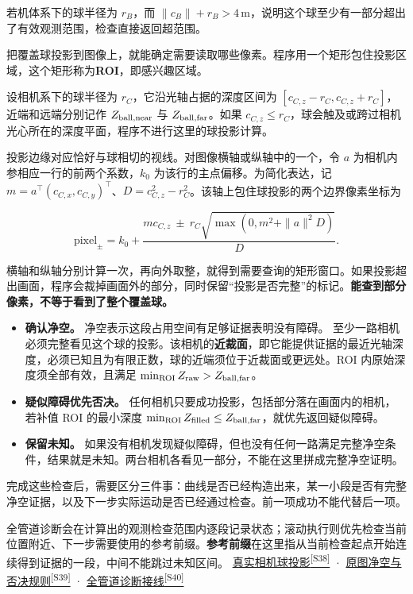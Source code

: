 \documentclass[11pt,a4paper]{article}
\numberwithin{equation}{topic}
\newcommand{\sourceref}[2]{\hyperlink{source-#1}{#2\textsuperscript{[#1]}}}
\begin{document}
若机体系下的球半径为 \(r_B\)，而 \(\|c_B\|+r_B>4\,\mathrm m\)，说明这个球至少有一部分超出了有效观测范围，检查直接返回超范围。

把覆盖球投影到图像上，就能确定需要读取哪些像素。程序用一个矩形包住投影区域，这个矩形称为\textbf{ROI}，即感兴趣区域。

设相机系下的球半径为 \(r_C\)，它沿光轴占据的深度区间为 \([c_{C,z}-r_C,c_{C,z}+r_C]\)，近端和远端分别记作 \(Z_{\rm ball,near}\) 与 \(Z_{\rm ball,far}\)。如果 \(c_{C,z}\le r_C\)，球会触及或跨过相机光心所在的深度平面，程序不进行这里的球投影计算。

投影边缘对应恰好与球相切的视线。对图像横轴或纵轴中的一个，令 \(a\) 为相机内参相应一行的前两个系数，\(k_0\) 为该行的主点偏移。为简化表达，记 \(m=a^\top(c_{C,x},c_{C,y})^\top\)、\(D=c_{C,z}^2-r_C^2\)。该轴上包住球投影的两个边界像素坐标为

\begin{equation}
\label{eq:image-bounds}
\mathrm{pixel}_{\pm}=k_0+
\frac{m c_{C,z}\ \pm\ r_C\sqrt{\max(0,m^2+\|a\|^2D)}}{D}.
\end{equation}

横轴和纵轴分别计算一次，再向外取整，就得到需要查询的矩形窗口。如果投影超出画面，程序会裁掉画面外的部分，同时保留“投影是否完整”的标记。\textbf{能查到部分像素，不等于看到了整个覆盖球。}

\begin{itemize}
\item \textbf{确认净空。} 净空表示这段占用空间有足够证据表明没有障碍。 至少一路相机必须完整看见这个球的投影。该相机的\textbf{近裁面}，即它能提供证据的最近光轴深度，必须已知且为有限正数，球的近端须位于近裁面或更远处。ROI 内原始深度须全部有效，且满足 \(\min_{\rm ROI}Z_{\rm raw}>Z_{\rm ball,far}\)。
\item \textbf{疑似障碍优先否决。} 任何相机只要成功投影，包括部分落在画面内的相机，若补值 ROI 的最小深度 \(\min_{\rm ROI}Z_{\rm filled}\le Z_{\rm ball,far}\)，就优先返回疑似障碍。
\item \textbf{保留未知。} 如果没有相机发现疑似障碍，但也没有任何一路满足完整净空条件，结果就是未知。两台相机各看见一部分，不能在这里拼成完整净空证明。
\end{itemize}

完成这些检查后，需要区分三件事：曲线是否已经构造出来，某一小段是否有完整净空证据，以及下一步实际运动是否已经通过检查。前一项成功不能代替后一项。

全管道诊断会在计算出的观测检查范围内逐段记录状态；滚动执行则优先检查当前位置附近、下一步需要使用的参考前缀。\textbf{参考前缀}在这里指从当前检查起点开始连续得到证据的一段，中间不能跳过未知区间。 \sourceref{S38}{真实相机球投影} · \sourceref{S39}{原图净空与否决规则} · \sourceref{S40}{全管道诊断接线}
\end{document}
